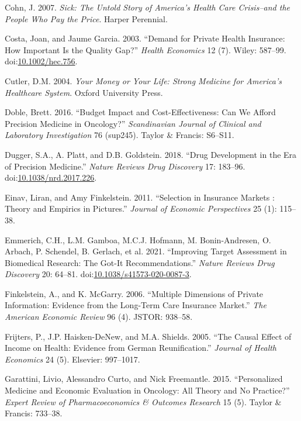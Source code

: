 \documentclass[a4paper,12pt]{article}
\begin{document}
\hypertarget{citeproc_bib_item_7}{Cohn, J. 2007. \textit{Sick: The Untold Story of America’s Health Care Crisis–and the People Who Pay the Price}. Harper Perennial.}

\hypertarget{citeproc_bib_item_8}{Costa, Joan, and Jaume Garcia. 2003. “Demand for Private Health Insurance: How Important Is the Quality Gap?” \textit{Health Economics} 12 (7). Wiley: 587–99. doi:\href{https://doi.org/10.1002/hec.756}{10.1002/hec.756}.}

\hypertarget{citeproc_bib_item_9}{Cutler, D.M. 2004. \textit{Your Money or Your Life: Strong Medicine for America’s Healthcare System}. Oxford University Press.}

\hypertarget{citeproc_bib_item_10}{Doble, Brett. 2016. “Budget Impact and Cost-Effectiveness: Can We Afford Precision Medicine in Oncology?” \textit{Scandinavian Journal of Clinical and Laboratory Investigation} 76 (sup245). Taylor \& Francis: S6–S11.}

\hypertarget{citeproc_bib_item_11}{Dugger, S.A., A. Platt, and D.B. Goldstein. 2018. “Drug Development in the Era of Precision Medicine.” \textit{Nature Reviews Drug Discovery} 17: 183–96. doi:\href{https://doi.org/10.1038/nrd.2017.226}{10.1038/nrd.2017.226}.}

\hypertarget{citeproc_bib_item_12}{Einav, Liran, and Amy Finkelstein. 2011. “Selection in Insurance Markets : Theory and Empirics in Pictures.” \textit{Journal of Economic Perspectives} 25 (1): 115–38.}

\hypertarget{citeproc_bib_item_13}{Emmerich, C.H., L.M. Gamboa, M.C.J. Hofmann, M. Bonin-Andresen, O. Arbach, P. Schendel, B. Gerlach, et al. 2021. “Improving Target Assessment in Biomedical Research: The Got-It Recommendations.” \textit{Nature Reviews Drug Discovery} 20: 64–81. doi:\href{https://doi.org/10.1038/s41573-020-0087-3}{10.1038/s41573-020-0087-3}.}

\hypertarget{citeproc_bib_item_14}{Finkelstein, A., and K. McGarry. 2006. “Multiple Dimensions of Private Information: Evidence from the Long-Term Care Insurance Market.” \textit{The American Economic Review} 96 (4). JSTOR: 938–58.}

\hypertarget{citeproc_bib_item_15}{Frijters, P., J.P. Haisken-DeNew, and M.A. Shields. 2005. “The Causal Effect of Income on Health: Evidence from German Reunification.” \textit{Journal of Health Economics} 24 (5). Elsevier: 997–1017.}

\hypertarget{citeproc_bib_item_16}{Garattini, Livio, Alessandro Curto, and Nick Freemantle. 2015. “Personalized Medicine and Economic Evaluation in Oncology: All Theory and No Practice?” \textit{Expert Review of Pharmacoeconomics \& Outcomes Research} 15 (5). Taylor \& Francis: 733–38.}
\end{document}
